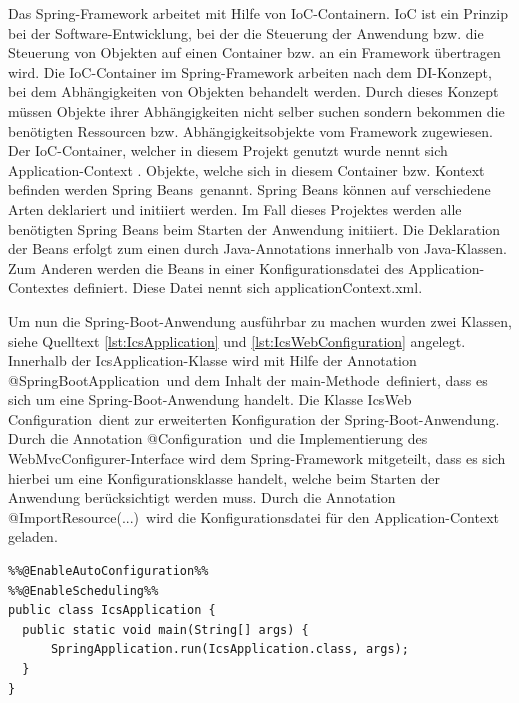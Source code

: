 	Das Spring-Framework arbeitet mit Hilfe von \ac{IoC}-Containern. \ac{IoC} ist ein Prinzip bei der Software-Entwicklung, bei der die Steuerung der Anwendung bzw. die Steuerung von Objekten auf einen Container bzw. an ein Framework übertragen wird. Die \ac{IoC}-Container im Spring-Framework arbeiten nach dem \ac{DI}-Konzept, bei dem Abhängigkeiten von Objekten behandelt werden. Durch dieses Konzept müssen Objekte ihrer Abhängigkeiten nicht selber suchen sondern bekommen die benötigten Ressourcen bzw. Abhängigkeitsobjekte vom Framework zugewiesen.\autocite{WikimediaFoundationInc.2019d} Der \ac{IoC}-Container, welcher in diesem Projekt genutzt wurde nennt sich \glqq Application-Context \grqq. Objekte, welche sich in diesem Container bzw. Kontext befinden werden \glqq Spring Beans\grqq \, genannt. Spring Beans können auf verschiedene Arten deklariert und initiiert werden. Im Fall dieses Projektes werden alle benötigten Spring Beans beim Starten der Anwendung initiiert. Die Deklaration der Beans erfolgt zum einen durch Java-Annotations innerhalb von Java-Klassen. Zum Anderen werden die Beans in einer Konfigurationsdatei des Application-Contextes definiert. Diese Datei nennt sich \glqq applicationContext.xml\grqq.

	Um nun die Spring-Boot-Anwendung ausführbar zu machen wurden zwei Klassen, siehe Quelltext \ref{lst:IcsApplication} und \ref{lst:IcsWebConfiguration} angelegt. Innerhalb der \glqq IcsApplication\grqq -Klasse wird mit Hilfe der Annotation \glqq @SpringBootApplication\grqq \, und dem Inhalt der \glqq main-Methode\grqq \, definiert, dass es sich um eine Spring-Boot-Anwendung handelt. Die Klasse  \glqq IcsWeb\\Configuration\grqq \, dient zur erweiterten Konfiguration der Spring-Boot-Anwendung. Durch die Annotation \glqq @Configuration\grqq \, und die Implementierung des \glqq WebMvcConfigurer\grqq -Interface wird dem Spring-Framework mitgeteilt, dass es sich hierbei um eine Konfigurationsklasse handelt, welche beim Starten der Anwendung berücksichtigt werden muss. Durch die Annotation \glqq @ImportResource(...)\grqq \, wird die Konfigurationsdatei für den Application-Context geladen. \\

\begin{lstlisting}[caption={IcsApplication.java}, label={lst:IcsApplication}, basicstyle=\ttfamily\fontsize{10}{12}\selectfont]
%%@SpringBootApplication%%
%%@EnableAutoConfiguration%%
%%@EnableScheduling%%
public class IcsApplication {
  public static void main(String[] args) {
	  SpringApplication.run(IcsApplication.class, args);
  }
}
\end{lstlisting}

